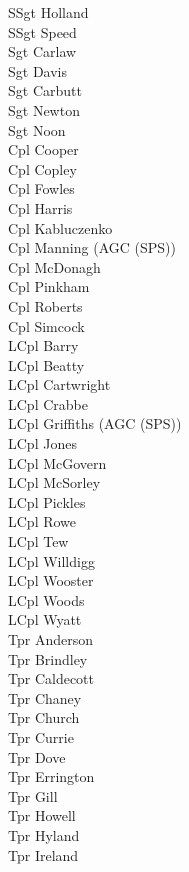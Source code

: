 \begin{multicols}{3}
  \small
  \noindent
  SSgt Holland \\
  SSgt Speed \\
  Sgt Carlaw \\
  Sgt Davis \\
  Sgt Carbutt \\
  Sgt Newton \\
  Sgt Noon \\
  Cpl Cooper \\
  Cpl Copley \\
  Cpl Fowles \\
  Cpl Harris \\
  Cpl Kabluczenko \\
  Cpl Manning (AGC (SPS)) \\
  Cpl McDonagh \\
  Cpl Pinkham \\
  Cpl Roberts \\
  Cpl Simcock \\
  LCpl Barry \\
  LCpl Beatty \\
  LCpl Cartwright \\
  LCpl Crabbe \\
  LCpl Griffiths (AGC (SPS)) \\
  LCpl Jones \\
  LCpl McGovern \\
  LCpl McSorley \\
  LCpl Pickles \\
  LCpl Rowe \\
  LCpl Tew \\
  LCpl Willdigg \\
  LCpl Wooster \\
  LCpl Woods \\
  LCpl Wyatt \\
  Tpr Anderson \\
  Tpr Brindley \\
  Tpr Caldecott \\
  Tpr Chaney \\
  Tpr Church \\
  Tpr Currie \\
  Tpr Dove \\
  Tpr Errington \\
  Tpr Gill \\
  Tpr Howell \\
  Tpr Hyland \\
  Tpr Ireland \\

\end{multicols}
